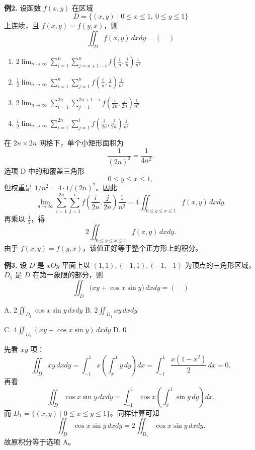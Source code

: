 \begin{problemblock}
\textbf{例2.} 设函数 \(f(x,y)\) 在区域
\[
D=\{(x,y)\mid 0\le x\le1,\ 0\le y\le1\}
\]
上连续，且 \(f(x,y)=f(y,x)\)，则
\[
\iint_D f(x,y)\,dxdy=(\quad)
\]
\begin{enumerate}[label=\Alph*., leftmargin=2.2em]
\item \(\displaystyle 2\lim_{n\to\infty}\sum_{i=1}^n\sum_{j=n+1-i}^n
f\left(\frac in,\frac jn\right)\frac1{n^2}\)
\item \(\displaystyle \frac12\lim_{n\to\infty}\sum_{i=1}^n\sum_{j=1}^n
f\left(\frac in,\frac jn\right)\frac1{n^2}\)
\item \(\displaystyle 2\lim_{n\to\infty}\sum_{i=1}^{2n}\sum_{j=1}^{2n+1-i}
f\left(\frac i{2n},\frac j{2n}\right)\frac1{n^2}\)
\item \(\displaystyle \frac12\lim_{n\to\infty}\sum_{i=1}^{2n}\sum_{j=1}^{i}
f\left(\frac i{2n},\frac j{2n}\right)\frac1{n^2}\)
\end{enumerate}
\end{problemblock}
\begin{solutionblock}
在 \(2n\times2n\) 网格下，单个小矩形面积为
\[
\frac1{(2n)^2}=\frac1{4n^2}.
\]
选项 D 中的和覆盖三角形
\[
0\le y\le x\le1,
\]
但权重是 \(1/n^2=4\cdot 1/(2n)^2\)。因此
\[
\lim_{n\to\infty}\sum_{i=1}^{2n}\sum_{j=1}^{i}
f\left(\frac i{2n},\frac j{2n}\right)\frac1{n^2}
=4\iint_{0\le y\le x\le1}f(x,y)\,dxdy.
\]
再乘以 \(\frac12\)，得
\[
2\iint_{0\le y\le x\le1}f(x,y)\,dxdy.
\]
由于 \(f(x,y)=f(y,x)\)，该值正好等于整个正方形上的积分。
\end{solutionblock}

\begin{problemblock}
\textbf{例3.} 设 \(D\) 是 \(xOy\) 平面上以 \((1,1),(-1,1),(-1,-1)\) 为顶点的三角形区域，\(D_1\) 是 \(D\) 在第一象限的部分，则
\[
\iint_D\bigl(xy+\cos x\sin y\bigr)\,dxdy=(\quad)
\]

A. \(\displaystyle 2\iint_{D_1}\cos x\sin y\,dxdy\)
\quad
B. \(\displaystyle 2\iint_{D_1}xy\,dxdy\)

C. \(\displaystyle 4\iint_{D_1}(xy+\cos x\sin y)\,dxdy\)
\quad
D. \(0\)
\end{problemblock}
\begin{solutionblock}
先看 \(xy\) 项：
\[
\iint_D xy\,dxdy
=\int_{-1}^1x\left(\int_x^1y\,dy\right)dx
=\int_{-1}^1\frac{x(1-x^2)}2\,dx=0.
\]
再看
\[
\iint_D\cos x\sin y\,dxdy
=\int_{-1}^1\cos x\left(\int_x^1\sin y\,dy\right)dx.
\]
而 \(D_1=\{(x,y)\mid 0\le x\le y\le1\}\)。同样计算可知
\[
\iint_D\cos x\sin y\,dxdy
=2\iint_{D_1}\cos x\sin y\,dxdy.
\]
故原积分等于选项 A。
\end{solutionblock}

